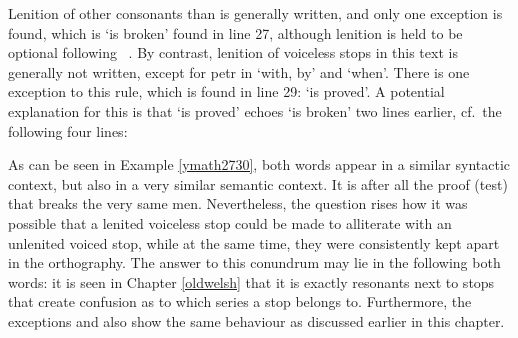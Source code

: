 Lenition of other consonants than  is generally written, and only one exception is found, which is  `is broken' found in line 27, although lenition is held to be optional following ~\autocite[380]{morgan_y_1952}. By contrast, lenition of voiceless stops in this text is generally not written, except for \gls{petr} in  `with, by' and  `when'. There is one exception to this rule, which is found in line 29:  `is proved'. A potential explanation for this is that  `is proved' echoes  `is broken' two lines earlier, cf.\ the following four lines:

As can be seen in Example \ref{ymath2730}, both words appear in a similar syntactic context, but also in a very similar semantic context. It is after all the proof (\ie test) that breaks the very same men. Nevertheless, the question rises how it was possible that a lenited voiceless stop could be made to alliterate with an unlenited voiced stop, while at the same time, they were consistently kept apart in the orthography. The answer to this conundrum may lie in the  following both words: it is seen in Chapter \ref{oldwelsh} that it is exactly resonants next to stops that create confusion as to which series a stop belongs to. Furthermore, the exceptions  and  also show the same behaviour as  discussed earlier in this chapter.
